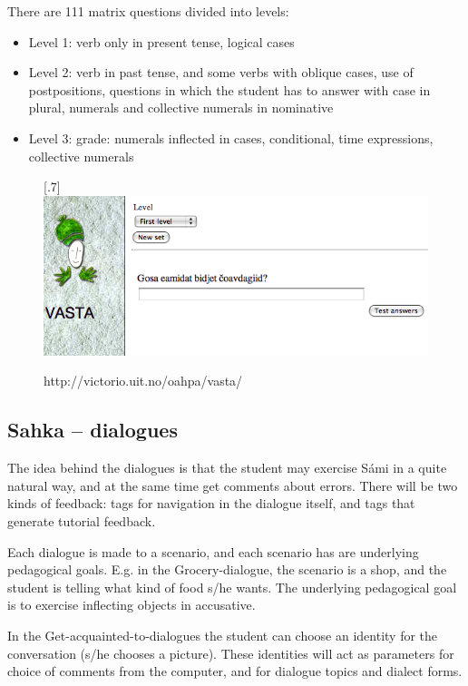 \documentclass[a4paper,12pt]{article}
\begin{document}
There are 111 matrix questions divided into levels:
\begin{itemize}
\item Level 1: verb only in present tense, logical cases
\item  Level 2: verb in past tense, and some verbs with oblique cases, use of postpositions, questions in which the student has to answer with case in plural,  numerals and collective numerals in nominative
\item  Level 3: grade: numerals inflected in cases, conditional, time expressions, collective numerals
\end{itemize}
\vspace{0.5cm}


\begin{figure}[htbp]
\begin{center}
\scalebox{.7}[.7]{\includegraphics{img/vasta.png}}\\
\caption{http://victorio.uit.no/oahpa/vasta/}
\label{vasta}
\end{center}
\end{figure}

	

\subsection{Sahka -- dialogues}
The idea behind the dialogues is that the student may exercise Sámi in a quite natural way, and at the same time get comments about errors. There will be two kinds of feedback: tags for navigation in the dialogue itself, and tags that generate tutorial feedback.

Each dialogue is made to a scenario, and each scenario has are underlying pedagogical goals. E.g. in the Grocery-dialogue, the scenario is a shop, and the student is telling what kind of food s/he wants. The underlying pedagogical goal is to exercise inflecting objects in accusative.

In the Get-acquainted-to-dialogues the student can choose an identity for the conversation (s/he chooses a picture). These identities will act as parameters for choice of comments from the computer, and for dialogue topics and dialect forms.
\end{document}
